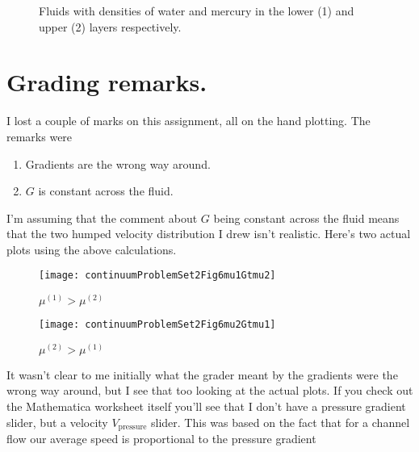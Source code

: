 \begin{figure}[htp]
   \centering
{}
   \caption{Fluids with densities of water and mercury in the lower (1) and upper (2) layers respectively.}
   \label{fig:continuumProblemSet2:continuumProblemSet2Animation2}
\end{figure}

\section{Grading remarks.}

I lost a couple of marks on this assignment, all on the hand plotting.  The remarks were

\begin{enumerate}
\item Gradients are the wrong way around.
\item $G$ is constant across the fluid.
\end{enumerate}

I'm assuming that the comment about $G$ being constant across the fluid means that the two humped velocity distribution I drew isn't realistic.  Here's two actual plots using the above calculations.

\begin{figure}[htp]
   \centering
   \texttt{[image: continuumProblemSet2Fig6mu1Gtmu2]}
   \caption{$\mu^{(1)} > \mu^{(2)}$}\label{fig:continuumProblemSet2:continuumProblemSet2Fig6mu1Gtmu2}
\end{figure}

\begin{figure}[htp]
   \centering
   \texttt{[image: continuumProblemSet2Fig6mu2Gtmu1]}
   \caption{$\mu^{(2)} > \mu^{(1)}$}\label{fig:continuumProblemSet2:continuumProblemSet2Fig6mu2Gtmu1}
\end{figure}

It wasn't clear to me initially what the grader meant by the gradients were the wrong way around, but I see that too looking at the actual plots.  If you check out the Mathematica worksheet itself you'll see that I don't have a pressure gradient slider, but a velocity $V_{\text{pressure}}$ slider.  This was based on the fact that for a channel flow our average speed is proportional to the pressure gradient

